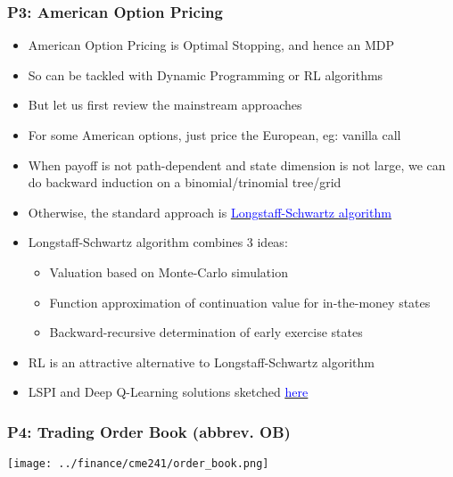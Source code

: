 \documentclass[handout]{beamer}
\begin{document}
\begin{frame}
\frametitle{P3: American Option Pricing}
\pause
\begin{itemize}[<+->]
\item American Option Pricing is Optimal Stopping, and hence an MDP
\item So can be tackled with Dynamic Programming or RL algorithms
\item But let us first review the mainstream approaches
\item For some American options, just price the European, eg: vanilla call
\item When payoff is not path-dependent and state dimension is not large, we can do backward induction on a binomial/trinomial tree/grid
\item Otherwise, the standard approach is \href{https://people.math.ethz.ch/~hjfurrer/teaching/LongstaffSchwartzAmericanOptionsLeastSquareMonteCarlo.pdf}{\underline{\textcolor{blue}{Longstaff-Schwartz algorithm}}}
\item Longstaff-Schwartz algorithm combines 3 ideas:
\begin{itemize}
\item Valuation based on Monte-Carlo simulation
\item Function approximation of continuation value for in-the-money states
\item Backward-recursive determination of early exercise states
\end{itemize}
\item RL is an attractive alternative to Longstaff-Schwartz algorithm
\item LSPI and Deep Q-Learning solutions sketched \href{https://github.com/coverdrive/technical-documents/blob/master/finance/cme241/Tour-Batch.pdf}{\underline{\textcolor{blue}{here}}}
\end{itemize}
\end{frame}

\begin{frame}
\frametitle{P4: Trading Order Book (abbrev. OB)}
\texttt{[image: ../finance/cme241/order\_book.png]}
\end{frame}
\end{document}
